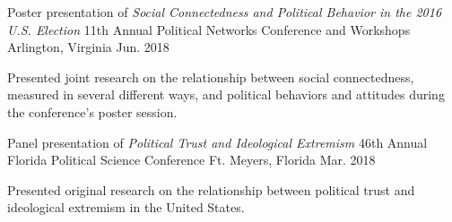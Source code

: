 

\begin{cventries}

\cventry
  {Poster presentation of \emph{Social Connectedness and Political Behavior in the 2016 U.S. Election}} %
  {11th Annual Political Networks Conference and Workshops} %
  {Arlington, Virginia} %
  {Jun. 2018} %
  {
    \begin{cvitems} %
      \item {Presented joint research on the relationship between social connectedness, measured in several different ways, and political behaviors and attitudes during the conference's poster session.}
    \end{cvitems}
  }

  \cventry
    {Panel presentation of \emph{Political Trust and Ideological Extremism}} %
    {46th Annual Florida Political Science Conference} %
    {Ft. Meyers, Florida} %
    {Mar. 2018} %
    {
      \begin{cvitems} %
        \item {Presented original research on the relationship between political trust and ideological extremism in the United States.}
      \end{cvitems}
    }


\end{cventries}
